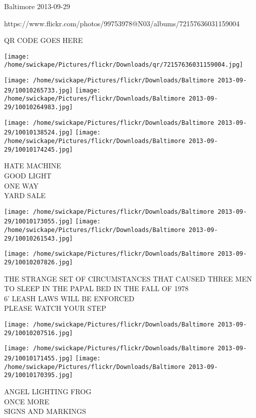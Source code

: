 \documentclass[10pt,letterpaper]{article}
\begin{document}
Baltimore 2013-09-29

https://www.flickr.com/photos/99753978@N03/albums/72157636031159004

QR CODE GOES HERE

\texttt{[image: /home/swickape/Pictures/flickr/Downloads/qr/72157636031159004.jpg]}
\pagebreak

\texttt{[image: /home/swickape/Pictures/flickr/Downloads/Baltimore 2013-09-29/10010265733.jpg]}
\texttt{[image: /home/swickape/Pictures/flickr/Downloads/Baltimore 2013-09-29/10010264983.jpg]}

\texttt{[image: /home/swickape/Pictures/flickr/Downloads/Baltimore 2013-09-29/10010138524.jpg]}
\texttt{[image: /home/swickape/Pictures/flickr/Downloads/Baltimore 2013-09-29/10010174245.jpg]}

HATE MACHINE\\
GOOD LIGHT\\
ONE WAY\\
YARD SALE\\
\pagebreak

\texttt{[image: /home/swickape/Pictures/flickr/Downloads/Baltimore 2013-09-29/10010173055.jpg]}
\texttt{[image: /home/swickape/Pictures/flickr/Downloads/Baltimore 2013-09-29/10010261543.jpg]}

\texttt{[image: /home/swickape/Pictures/flickr/Downloads/Baltimore 2013-09-29/10010207826.jpg]}

THE STRANGE SET OF CIRCUMSTANCES THAT CAUSED THREE MEN TO SLEEP IN THE PAPAL BED IN THE FALL OF 1978\\
6' LEASH LAWS WILL BE ENFORCED\\
PLEASE WATCH YOUR STEP\\
\pagebreak

\texttt{[image: /home/swickape/Pictures/flickr/Downloads/Baltimore 2013-09-29/10010207516.jpg]}

\vspace{0.25in}
\texttt{[image: /home/swickape/Pictures/flickr/Downloads/Baltimore 2013-09-29/10010171455.jpg]}
\texttt{[image: /home/swickape/Pictures/flickr/Downloads/Baltimore 2013-09-29/10010170395.jpg]}

ANGEL LIGHTING FROG\\
ONCE MORE\\
SIGNS AND MARKINGS\\
\pagebreak
\end{document}
